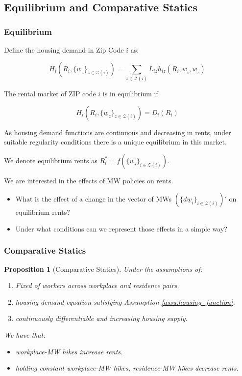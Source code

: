 \documentclass[aspectratio=169, t]{beamer}
\newtheorem{prop}{Proposition}
\newcommand{\Z}{\mathcal{Z}}
\newcommand{\MW}{\underline{w}}
\begin{document}
\subsection{Equilibrium and Comparative Statics}
\begin{frame}
	\frametitle{Equilibrium}
	
	Define the housing demand in Zip Code $i$ as:
	
	 \[
	 H_{i} (R_i, \{\MW_z\}_{z\in\Z(i)}) = \sum_{z\in\Z(i)} L_{iz} h_{iz} (R_i, \MW_i, \MW_z)
	 \]
	
	The rental market of ZIP code $i$ is in equilibrium if
	
	$$ H_{i} (R_i, \{\MW_z\}_{z\in\Z(i)}) = D_i(R_i) $$
	
    As housing demand functions are continuous and decreasing in rents, 
    under suitable regularity conditions there is a unique equilibrium in this market.%
    
    \vspace{2mm}

    We denote equilibrium rents as $R^*_i = f(\{\MW_i\}_{i\in\Z(i)})$.
	
	\vspace{5mm}
	\pause
	We are interested in the effects of MW policies on rents.
	\vspace{1mm}
	\begin{itemize} \small
		\item What is the effect of a change in the vector of MWs 
		$(\{d \MW_i\}_{i\in\Z(i)})'$ on equilibrium rents?
		\item Under what conditions can we represent those effects in a simple way?
	\end{itemize}
\end{frame}

\begin{frame}[label = prop_comp_stat]
    \frametitle{Comparative Statics}
    
    \begin{prop}[Comparative Statics]\label{prop:comparative_statics}
        Under the assumptions of:
        \begin{enumerate}
           \item Fixed of workers across workplace and residence pairs.
            \item housing demand equation satisfying Assumption \ref{assu:housing_function}, 
            \item continuously differentiable and increasing housing supply.
        \end{enumerate} 
        We have that:
        \begin{itemize}
            \item workplace-MW hikes increase rents.
            \item holding constant workplace-MW hikes, residence-MW hikes decrease rents.
        \end{itemize}
    \end{prop}
\end{frame}
\end{document}

